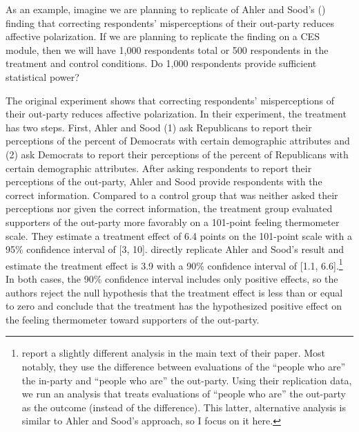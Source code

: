 \documentclass[12pt]{article}
\begin{document}
As an example, imagine we are planning to replicate of Ahler and Sood's (\citeyear{Ahler2018}) finding that correcting respondents' misperceptions of their out-party reduces affective polarization.
If we are planning to replicate the finding on a CES module, then we will have 1,000 respondents total or 500 respondents in the treatment and control conditions. 
Do 1,000 respondents provide sufficient statistical power?

The original experiment shows that correcting respondents' misperceptions of their out-party reduces affective polarization. 
In their experiment, the treatment has two steps. 
First, Ahler and Sood (1) ask Republicans to report their perceptions of the percent of Democrats with certain demographic attributes and (2) ask Democrats to report their perceptions of the percent of Republicans with certain demographic attributes. 
After asking respondents to report their perceptions of the out-party, Ahler and Sood provide respondents with the correct information. 
Compared to a control group that was neither asked their perceptions nor given the correct information, the treatment group evaluated supporters of the out-party more favorably on a 101-point feeling thermometer scale. 
They estimate a treatment effect of 6.4 points on the 101-point scale with a 95\% confidence interval of [3,
10]. 
\cite{Broockman2022} directly replicate
Ahler and Sood's result and estimate the treatment effect is 3.9 with a 90\% confidence interval of
[1.1, 6.6].\footnote{\cite{Broockman2022} report a
  slightly different analysis in the main text of their paper. Most
  notably, they use the difference between evaluations of the ``people
  who are'' the in-party and ``people who are'' the out-party. Using
  their replication data, we run an analysis that treats evaluations of
  ``people who are'' the out-party as the outcome (instead of the
  difference). This latter, alternative analysis is similar to Ahler and
  Sood's approach, so I focus on it here.} 
In both cases, the 90\% confidence interval includes only positive effects, so the authors reject the null hypothesis that the treatment effect is less than or equal to zero and conclude that the treatment has the hypothesized positive effect on the feeling thermometer toward supporters of the out-party.
\end{document}
